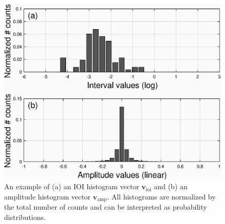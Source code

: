 \documentclass{ws-ijsc}
\begin{document}
\begin{figure}
    \centering
    \includegraphics[width = 0.8 \linewidth]{./figs/ioi_hist_examples.eps}
    \caption{An example of (a) an IOI histogram vector $\mathbf{v}_\mathrm{ioi}$ and (b) an amplitude histogram vector $\mathbf{v}_\mathrm{amp}$. All histograms are normalized by the total number of counts and can be interpreted as probability distributions.} 
    \label{fig:ioi_hist_example}
\end{figure}
\end{document}
